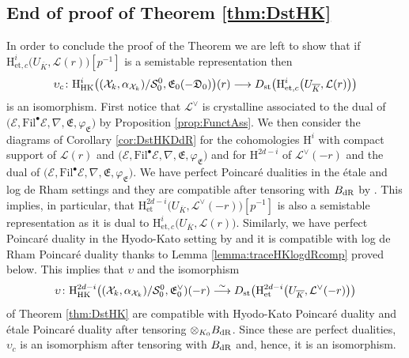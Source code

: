 \documentclass[asterisque,english]{smfart}
\begin{document}
\subsection{End of proof of Theorem \ref{thm:DstHK}}\label{sec:conclusionproffofTHM} In order to conclude the proof of the Theorem we  are left to show that if $\mathrm{H}^i_{\mathrm{et},c}\bigl(U_{\overline{K}}, \mathcal{L}(r)\bigr)[p^{-1}]$ is a semistable representation then  
$$\upsilon_c\colon \mathrm{H}^{i}_{\mathrm{HK}}\bigl((\mathcal{X}_k,\alpha_{\mathcal{X}_k})/ \mathcal{S}_0^0,\mathfrak{E}_0(-\mathfrak{D}_0)\bigr)(r) \longrightarrow D_{\rm st}\bigl(\mathrm{H}^i_{\mathrm{et},c}\bigl(U_{\overline{K}}, \mathcal{L}(r)\bigr) \bigr)$$is an isomorphism.   First notice that $\mathcal{L}^\vee$ is crystalline associated to the dual of $ \bigl(\mathcal{E},\mathrm{Fil}^\bullet \mathcal{E}, \nabla,\mathfrak{E},\varphi_{\mathfrak{E}}\bigr)$ by Proposition \ref{prop:FunctAss}. We then consider the diagrams of Corollary \ref{cor:DstHKDdR} for the cohomologies $\mathrm{H}^{i}$ with compact support of  $\mathcal{L}(r)$  and $ \bigl(\mathcal{E},\mathrm{Fil}^\bullet \mathcal{E}, \nabla,\mathfrak{E},\varphi_{\mathfrak{E}}\bigr)$
and for $\mathrm{H}^{2d-i}$  of $\mathcal{L}^\vee(-r)$ and the dual of $ \bigl(\mathcal{E},\mathrm{Fil}^\bullet \mathcal{E}, \nabla,\mathfrak{E},\varphi_{\mathfrak{E}}\bigr)$.  We have perfect Poincar\'e dualities in the \'etale  and log de Rham settings and they are compatible after tensoring with $B_{\rm dR}$ by  \cite[Thm.~4.4.1(4)]{LLZ}. This implies, in particular, that $\mathrm{H}^{2d-i}_{\mathrm{et}}\bigl(U_{\overline{K}}, \mathcal{L}^\vee(-r)\bigr)[p^{-1}]$ is also a semistable representation as it is dual to  $\mathrm{H}^i_{\mathrm{et},c}\bigl(U_{\overline{K}}, \mathcal{L}(r)\bigr)$. Similarly, we have perfect Poincar\'e duality  in the Hyodo-Kato setting by \cite[Prop.~4.6]{EY} and it is compatible with log de Rham Poincar\'e duality  thanks to Lemma \ref{lemma:traceHKlogdRcomp} proved below. This implies that $\upsilon$ and the isomorphism $$\upsilon\colon \mathrm{H}^{2d-i}_{\mathrm{HK}}\bigl((\mathcal{X}_k,\alpha_{\mathcal{X}_k})/ \mathcal{S}_0^0,\mathfrak{E}_0^\vee)(-r) \stackrel{\sim}{\longrightarrow} D_{\rm st}\bigl(\mathrm{H}^{2d-i}_{\mathrm{et}}\bigl(U_{\overline{K}}, \mathcal{L}^\vee(-r)\bigr) \bigr)$$of Theorem \ref{thm:DstHK} are compatible with Hyodo-Kato Poincar\'e duality and \'etale Poincar\'e duality  after tensoring  $\otimes_{K_0} B_{\rm dR}$. Since these are perfect dualities, $\upsilon_c$ is an isomorphism after tensoring  with $B_{\rm dR}$ and, hence, it is an isomorphism. 
\end{document}
